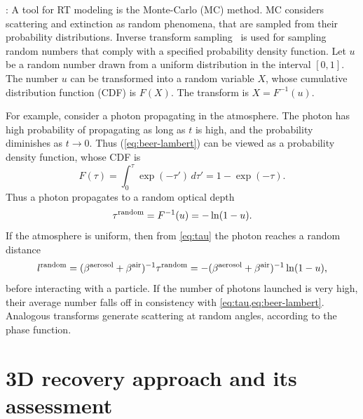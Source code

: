 \documentclass[10pt,letterpaper]{article}
\newcommand{\derivsym}[1]{\,d{#1}}
\begin{document}
: A tool for RT modeling is
the Monte-Carlo (MC) method. MC considers scattering and extinction as
random phenomena, that are sampled from their probability
distributions.
Inverse transform sampling~\cite{devroye1986sample} is used for
sampling random numbers that comply with a specified
probability density function. Let $u$ be a random number drawn
from a uniform distribution in the interval $[0,1]$. The number $u$
can be transformed into a random variable $X$, whose cumulative
distribution function (CDF) is $F(X)$. The transform is $X =
F^{-1}(u)$.

For example, consider a photon propagating in the atmosphere.  The
photon has high probability of propagating as long as $t$ is high, and
the probability diminishes as $t\rightarrow 0$. Thus
(\cref{eq:beer-lambert}) can be viewed as a probability density
function, whose CDF is
\begin{equation}
  \label{eq:Ftau}
  F(\tau)=\int_{0}^{\tau}\exp(-\tau')\derivsym{\tau'}=1-\exp(-\tau).
\end{equation}
Thus a photon propagates to a random optical depth
\begin{equation}
  \label{eq:taurand}
  \tau^{\rm random}=F^{-1}(u)=-\ln(1-u).
\end{equation}
If the atmosphere is uniform, then from \cref{eq:tau} the photon
reaches a random distance
\begin{equation}
  \label{eq:lrand}
  l^{\rm random}= (\beta^{\rm aerosol}+\beta^{\rm air})^{-1} \tau^{\rm random}
  = -(\beta^{\rm aerosol}+\beta^{\rm air})^{-1}\ln(1-u),
\end{equation}
before interacting with a particle. If the number of photons launched
is very high, their average number falls off in consistency with
\cref{eq:tau,eq:beer-lambert}.  Analogous transforms
generate scattering at random angles, according to the phase function.


\section{3D recovery approach and its assessment}
\label{sec:methodology}
\end{document}
